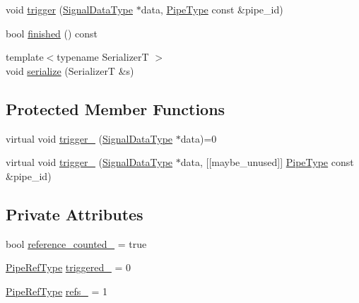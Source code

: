 \begin{DoxyCompactItemize}
void \hyperlink{structvt_1_1pipe_1_1callback_1_1_callback_base_ad54d116447acb7f1d051db946b2e875c}{trigger} (\hyperlink{structvt_1_1pipe_1_1callback_1_1_callback_base_aa1c1fd83b75220a50f6dcd7c1617726e}{Signal\+Data\+Type} $\ast$data, \hyperlink{namespacevt_ac9852acda74d1896f48f406cd72c7bd3}{Pipe\+Type} const \&pipe\+\_\+id)
\item 
bool \hyperlink{structvt_1_1pipe_1_1callback_1_1_callback_base_a20ed519d03b62560080ce3bdb8986f03}{finished} () const
\item 
{\footnotesize template$<$typename SerializerT $>$ }\\void \hyperlink{structvt_1_1pipe_1_1callback_1_1_callback_base_a4baca91fd4545ca13f34c75255209edd}{serialize} (SerializerT \&s)
\end{DoxyCompactItemize}
\subsection*{Protected Member Functions}
\begin{DoxyCompactItemize}
\item 
virtual void \hyperlink{structvt_1_1pipe_1_1callback_1_1_callback_base_a75a9b0103e0129f536385b10b86400c3}{trigger\+\_\+} (\hyperlink{structvt_1_1pipe_1_1callback_1_1_callback_base_aa1c1fd83b75220a50f6dcd7c1617726e}{Signal\+Data\+Type} $\ast$data)=0
\item 
virtual void \hyperlink{structvt_1_1pipe_1_1callback_1_1_callback_base_ae4a19fced0abfb6543d4417efeb7e831}{trigger\+\_\+} (\hyperlink{structvt_1_1pipe_1_1callback_1_1_callback_base_aa1c1fd83b75220a50f6dcd7c1617726e}{Signal\+Data\+Type} $\ast$data, \mbox{[}\mbox{[}maybe\+\_\+unused\mbox{]}\mbox{]} \hyperlink{namespacevt_ac9852acda74d1896f48f406cd72c7bd3}{Pipe\+Type} const \&pipe\+\_\+id)
\end{DoxyCompactItemize}
\subsection*{Private Attributes}
\begin{DoxyCompactItemize}
\item 
bool \hyperlink{structvt_1_1pipe_1_1callback_1_1_callback_base_a5b996f1bdf68fe4ef90c8c1fe2241c59}{reference\+\_\+counted\+\_\+} = true
\item 
\hyperlink{namespacevt_ace18d74dd489d9ea506d38789fffce34}{Pipe\+Ref\+Type} \hyperlink{structvt_1_1pipe_1_1callback_1_1_callback_base_a815cf081302f47d4fe68fad7270ac99b}{triggered\+\_\+} = 0
\item 
\hyperlink{namespacevt_ace18d74dd489d9ea506d38789fffce34}{Pipe\+Ref\+Type} \hyperlink{structvt_1_1pipe_1_1callback_1_1_callback_base_ab9464e03ecca5b6ce2186f5cc6e8110f}{refs\+\_\+} = 1
\end{DoxyCompactItemize}


